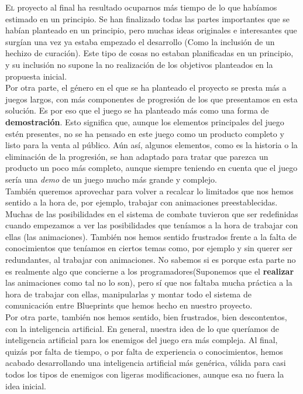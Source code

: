 \lettrine[lines=2,findent=2pt,nindent=3pt,loversize=0.1]{\textcolor[gray]{0.4}{E}}{l} proyecto al final ha resultado ocuparnos más tiempo de lo que habíamos estimado en un principio. Se han finalizado todas las partes importantes que se habían planteado en un principio, pero muchas ideas originales e interesantes que surgían una vez ya estaba empezado el desarrollo (Como la inclusión de un hechizo de curación). Este tipo de cosas no estaban planificadas en un principio, y su inclusión no supone la no realización de los objetivos planteados en la propuesta inicial.
\\

Por otra parte, el género en el que se ha planteado el proyecto se presta más a juegos largos, con más componentes de progresión de los que presentamos en esta solución. Es por eso que el juego se ha planteado más como una forma de \textbf{demostración}. Esto significa que, aunque los elementos principales del juego estén presentes, no se ha pensado en este juego como un producto completo y listo para la venta al público. Aún así, algunos elementos, como es la historia o la eliminación de la progresión, se han adaptado para tratar que parezca un producto un poco más completo, aunque siempre teniendo en cuenta que el juego sería una \textit{demo} de un juego mucho más grande y complejo.
\\

También queremos aprovechar para volver a recalcar lo limitados que nos hemos sentido a la hora de, por ejemplo, trabajar con animaciones preestablecidas. Muchas de las posibilidades en el sistema de combate tuvieron que ser redefinidas cuando empezamos a ver las posibilidades que teníamos a la hora de trabajar con ellas (las animaciones). También nos hemos sentido frustrados frente a la falta de conocimientos que teníamos en ciertos temas como, por ejemplo y sin querer ser redundantes, al trabajar con animaciones. No sabemos si es porque esta parte no es realmente algo que concierne a los programadores(Suponemos que el \textbf{realizar} las animaciones como tal no lo son), pero sí que nos faltaba mucha práctica a la hora de trabajar con ellas, manipularlas y montar todo el sistema de comunicación entre Blueprints que hemos hecho en nuestro proyecto.
\\

Por otra parte, también nos hemos sentido, bien frustrados, bien descontentos, con la inteligencia artificial. En general, nuestra idea de lo que queríamos de inteligencia artificial para los enemigos del juego era más compleja. Al final, quizás por falta de tiempo, o por falta de experiencia o conocimientos, hemos acabado desarrollando una inteligencia artificial más genérica, válida para casi todos los tipos de enemigos con ligeras modificaciones, aunque esa no fuera la idea inicial.
\\

